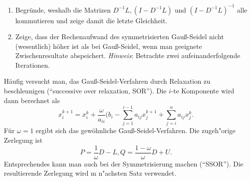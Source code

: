 \begin{aufg}
\begin{enumerate}
\item Begr\"unde, weshalb die Matrizen $D^{-1}L, (I-D^{-1}L)$ und $(I-D^{-1}L)^{-1}$ alle kommutieren und zeige damit die letzte Gleichheit.
\item Zeige, dass der Rechenaufwand des symmetrisierten Gau\ss{}-Seidel nicht (wesentlich) h\"oher ist als bei Gau\ss{}-Seidel, wenn man geeignete Zwischenresultate abspeichert. {\em Hinweis}: Betrachte zwei aufeinanderfolgende Iterationen.
\end{enumerate}
\end{aufg}

H\"aufig versucht man, das Gau\ss{}-Seidel-Verfahren durch Relaxation zu beschleunigen (``successive over relaxation, SOR''). Die $i$-te Komponente wird dann berechnet als
\[
x_i^{k+1} = x_i^{k} + \frac{\omega}{a_{ii}}(b_i - \sum_{j=1}^{i-1}a_{ij}x_j^{k+1} + \sum_{j=i}^{n}a_{ij}x_j^{k}.
\]
F\"ur $\omega = 1$ ergibt sich das gew\"ohnliche Gau\ss{}-Seidel-Verfahren. Die zugeh"orige Zerlegung ist
\[
P = \frac{1}{\omega}D-L, Q = \frac{1-\omega}{\omega}D+U.
\]
Entsprechendes kann man auch bei der Symmetrisierung machen (``SSOR''). Die resultierende Zerlegung wird m n"achsten Satz verwendet.

